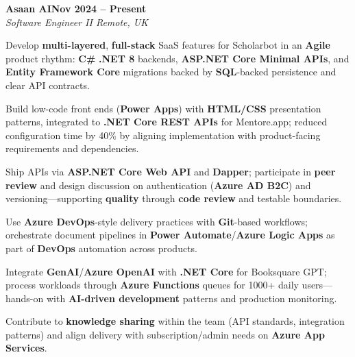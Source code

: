 \documentclass[letterpaper,10pt]{article}
\newcommand{\headingBf}[2]{
  \hspace{10pt}\textbf{#1}\hfill\textbf{#2}\\
}
\newcommand{\headingIt}[2]{
  \hspace{10pt}\textit{#1}\hfill\textit{#2}\\
}
\newenvironment{resume_list}{
  \vspace{-7pt}
  \begin{itemize}[itemsep=-2px, parsep=1pt, leftmargin=30pt]
}{
  \end{itemize}
}
\begin{document}
\headingBf{Asaan AI}{Nov 2024 -- Present}
\headingIt{Software Engineer II \hfill Remote, UK}{}
\begin{resume_list}
    \item Develop \textbf{multi-layered}, \textbf{full-stack} SaaS features for Scholarbot in an \textbf{Agile} product rhythm: \textbf{C\#} \textbf{.NET 8} backends, \textbf{ASP.NET Core Minimal APIs}, and \textbf{Entity Framework Core} migrations backed by \textbf{SQL}-backed persistence and clear API contracts.
    \item Build low-code front ends (\textbf{Power Apps}) with \textbf{HTML/CSS} presentation patterns, integrated to \textbf{.NET Core REST APIs} for Mentore.app; reduced configuration time by 40\% by aligning implementation with product-facing requirements and dependencies.
    \item Ship APIs via \textbf{ASP.NET Core Web API} and \textbf{Dapper}; participate in \textbf{peer review} and design discussion on authentication (\textbf{Azure AD B2C}) and versioning---supporting \textbf{quality} through \textbf{code review} and testable boundaries.
    \item Use \textbf{Azure DevOps}-style delivery practices with \textbf{Git}-based workflows; orchestrate document pipelines in \textbf{Power Automate}/\textbf{Azure Logic Apps} as part of \textbf{DevOps} automation across products.
    \item Integrate \textbf{GenAI}/\textbf{Azure OpenAI} with \textbf{.NET Core} for Booksquare GPT; process workloads through \textbf{Azure Functions} queues for 1000+ daily users---hands-on with \textbf{AI-driven development} patterns and production monitoring.
    \item Contribute to \textbf{knowledge sharing} within the team (API standards, integration patterns) and align delivery with subscription/admin needs on \textbf{Azure App Services}.
\end{resume_list}
\end{document}
